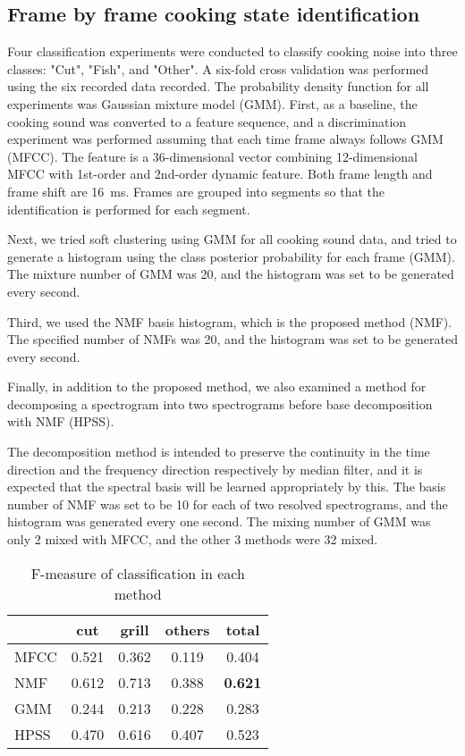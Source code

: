 \documentclass[sigchi]{acmart}
\begin{document}
\subsection{Frame by frame cooking state identification}
Four classification experiments were conducted to classify cooking noise into three classes: "Cut", "Fish", and "Other". A six-fold cross validation was performed using the six recorded data recorded. The probability density function for all experiments was Gaussian mixture model (GMM).
First, as a baseline, the cooking sound was converted to a feature sequence, and a discrimination experiment was performed assuming that each time frame always follows GMM (MFCC).
The feature is a 36-dimensional vector combining 12-dimensional MFCC with 1st-order and 2nd-order dynamic feature. Both frame length and frame shift are \SI{16}{ms}. Frames are grouped into segments so that the identification is performed for each segment.

Next, we tried soft clustering using GMM for all cooking sound data, and tried to generate a histogram using the class posterior probability for each frame (GMM). The mixture number of GMM was 20, and the histogram was set to be generated every second.

Third, we used the NMF basis histogram, which is the proposed method (NMF). The specified number of NMFs was 20, and the histogram was set to be generated every second.

Finally, in addition to the proposed method, we also examined a method for decomposing a spectrogram into two spectrograms before base decomposition with NMF (HPSS).

The decomposition method is intended to preserve the continuity in the time direction and the frequency direction respectively by median filter, and it is expected that the spectral basis will be learned appropriately by this.
The basis number of NMF was set to be 10 for each of two resolved spectrograms, and the histogram was generated every one second.
The mixing number of GMM was only 2 mixed with MFCC, and the other 3 methods were 32 mixed.

\begin{table}[t]
\centering
\caption{F-measure of classification in each method}
\vspace{5pt}
\label{result}
\begin{tabular}{l|ccc|c}
\hline
\hline
      & cut   & grill & others & total \\ \hline
MFCC  & 0.521 & 0.362 & 0.119  & 0.404 \\ %
NMF   & 0.612 & 0.713 & 0.388  & {\bf 0.621} \\ %
GMM   & 0.244 & 0.213 & 0.228  & 0.283 \\ %
HPSS  & 0.470 & 0.616 & 0.407  & 0.523 \\ \hline\hline
\end{tabular}
\end{table}
\end{document}
